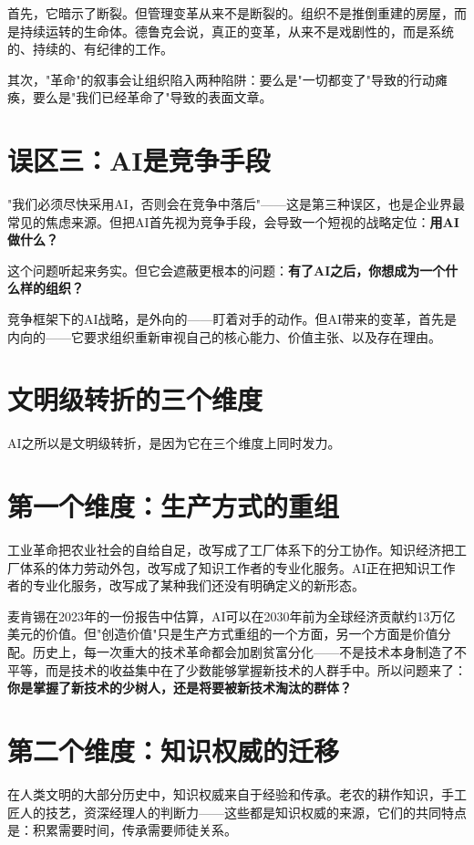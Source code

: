 首先，它暗示了断裂。但管理变革从来不是断裂的。组织不是推倒重建的房屋，而是持续运转的生命体。德鲁克会说，真正的变革，从来不是戏剧性的，而是系统的、持续的、有纪律的工作。

其次，"革命"的叙事会让组织陷入两种陷阱：要么是"一切都变了"导致的行动瘫痪，要么是"我们已经革命了"导致的表面文章。

\section{误区三：AI是竞争手段}


"我们必须尽快采用AI，否则会在竞争中落后"——这是第三种误区，也是企业界最常见的焦虑来源。但把AI首先视为竞争手段，会导致一个短视的战略定位：\textbf{用AI做什么？}

这个问题听起来务实。但它会遮蔽更根本的问题：\textbf{有了AI之后，你想成为一个什么样的组织？}

竞争框架下的AI战略，是外向的——盯着对手的动作。但AI带来的变革，首先是内向的——它要求组织重新审视自己的核心能力、价值主张、以及存在理由。


\section{文明级转折的三个维度}


AI之所以是文明级转折，是因为它在三个维度上同时发力。

\section{第一个维度：生产方式的重组}


工业革命把农业社会的自给自足，改写成了工厂体系下的分工协作。知识经济把工厂体系的体力劳动外包，改写成了知识工作者的专业化服务。AI正在把知识工作者的专业化服务，改写成了某种我们还没有明确定义的新形态。

麦肯锡在2023年的一份报告中估算，AI可以在2030年前为全球经济贡献约13万亿美元的价值。但"创造价值"只是生产方式重组的一个方面，另一个方面是价值分配。历史上，每一次重大的技术革命都会加剧贫富分化——不是技术本身制造了不平等，而是技术的收益集中在了少数能够掌握新技术的人群手中。所以问题来了： \textbf{你是掌握了新技术的少树人，还是将要被新技术淘汰的群体？}

\section{第二个维度：知识权威的迁移}


在人类文明的大部分历史中，知识权威来自于经验和传承。老农的耕作知识，手工匠人的技艺，资深经理人的判断力——这些都是知识权威的来源，它们的共同特点是：积累需要时间，传承需要师徒关系。

